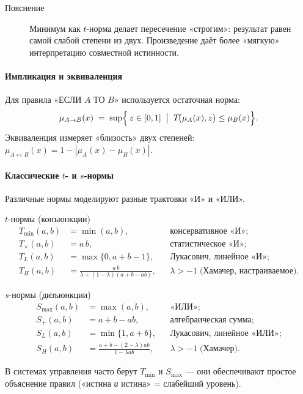 \begin{description}
  \item[Пояснение] 
    Минимум как $t$-норма делает пересечение «строгим»: результат равен 
    самой слабой степени из двух. Произведение даёт более «мягкую» 
    интерпретацию совместной истинности.
\end{description}

\vspace{0.5em}
\noindent
\paragraph{Импликация и эквиваленция}
Для правила «ЕСЛИ $A$ ТО $B$» используется остаточная норма:
\begin{equation}
  \mu_{A\to B}(x)
  \;=\;
  \sup\Bigl\{\,z\in[0,1]\;\bigm|\;
       T\!\bigl(\mu_A(x),z\bigr)\le \mu_B(x)\Bigr\}.
\end{equation}
Эквиваленция измеряет «близость» двух степеней:
\(
  \mu_{A\leftrightarrow B}(x)=1-|\mu_A(x)-\mu_B(x)|.
\)
\paragraph{Классические $t$- и $s$-нормы}

Различные нормы моделируют разные трактовки «И» и «ИЛИ».
\begin{description}
  \item $t$-нормы (конъюнкции)
  \begin{align*}
    T_{\min}(a,b) &= \min(a,b), && \text{консервативное «И»};\\
    T_{\times}(a,b) &= a\,b,     && \text{статистическое «И»};\\
    T_{L}(a,b) &= \max\{0,a+b-1\}, && \text{Лукасович, линейное «И»};\\
    T_{H}(a,b) &= 
      \frac{a\,b}{\lambda+(1-\lambda)(a+b-ab)},
      &&\lambda>-1\;\text{(Хамачер, настраиваемое)}.
  \end{align*}
  \item $s$-нормы (дизъюнкции)
  \begin{align*}
    S_{\max}(a,b) &= \max(a,b), && \text{«ИЛИ»};\\
    S_{+}(a,b) &= a+b-ab,       && \text{алгебраическая сумма};\\
    S_{L}(a,b) &= \min\{1,a+b\},&& \text{Лукасович, линейное «ИЛИ»};\\
    S_{H}(a,b) &=
      \frac{a+b-(2-\lambda)ab}{1-\lambda ab},
      &&\lambda>-1\;\text{(Хамачер)}.
  \end{align*}
\end{description}
\medskip
В системах управления часто берут
$T_{\min}$ и $S_{\max}$ —
они обеспечивают простое объяснение правил
(«истина \emph{и} истина» = слабейший уровень).

